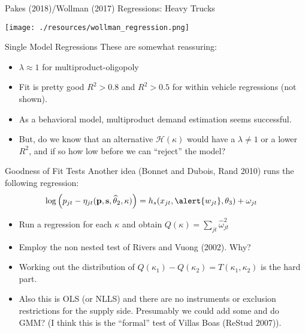 \begin{frame}{Pakes (2018)/Wollman (2017) Regressions: Heavy Trucks}
\begin{center}
\texttt{[image: ./resources/wollman\_regression.png]}
\end{center}
\end{frame}

\begin{frame}{Single Model Regressions}
These are somewhat reassuring:
\begin{itemize}
\item $\lambda\approx 1$ for multiproduct-oligopoly
\item Fit is pretty good $R^2 > 0.8$ and $R^2 > 0.5$ for within vehicle regressions (not shown).
\item As a behavioral model, multiproduct demand estimation seems successful.
\item But, do we know that an alternative $\mathcal{H}(\kappa)$ would have a $\lambda \neq 1$ or a lower $R^2$, and if so how low before we can ``reject'' the model?
\end{itemize}
\end{frame}

\begin{frame}{Goodness of Fit Tests}
Another idea (Bonnet and Dubois, Rand 2010) runs the following regression:
\begin{align*}
\log \left( p_{jt} - \eta_{jt}(\mathbf{p},\mathbf{s},\widehat{\theta}_2,\kappa) \right) &= h_s(x_{jt}, \alert{w_{jt}},\theta_3) + \omega_{jt}
\end{align*}
\begin{itemize}
\item Run a regression for each $\kappa$ and obtain $Q(\kappa)=\sum_{jt} \widehat{\omega}_{jt}^2$
\item Employ the \alert{non nested test} of Rivers and Vuong (2002). Why?
\item Working out the distribution of $Q(\kappa_1) - Q(\kappa_2)=T(\kappa_1,\kappa_2)$ is the hard part.
\item Also this is OLS (or NLLS) and there are no instruments or \alert{exclusion restrictions} for the supply side. Presumably we could add some and do GMM? (I think this is the ``formal'' test of Villas Boas (ReStud 2007)).
\end{itemize}
\end{frame}


